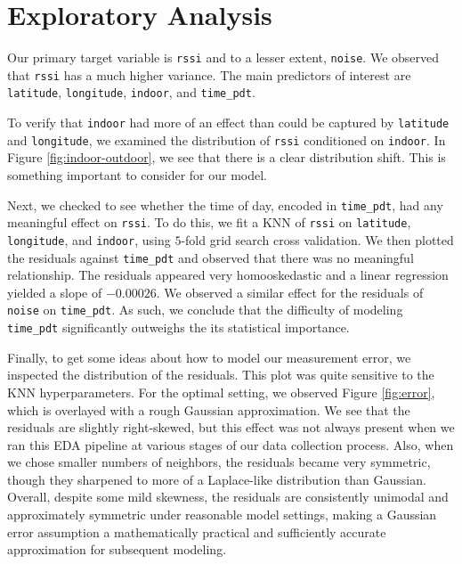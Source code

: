 \documentclass{article}
\begin{document}
\section{Exploratory Analysis}


Our primary target variable is \texttt{rssi} and to a lesser extent, \texttt{noise}. We observed that \texttt{rssi} has a much higher variance. The main predictors of interest are \texttt{latitude}, \texttt{longitude}, \texttt{indoor}, and \texttt{time\_pdt}.

To verify that \texttt{indoor} had more of an effect than could be captured by \texttt{latitude} and \texttt{longitude}, we examined the distribution of \texttt{rssi} conditioned on \texttt{indoor}. In Figure \ref{fig:indoor-outdoor}, we see that there is a clear distribution shift. This is something important to consider for our model.

Next, we checked to see whether the time of day, encoded in \texttt{time\_pdt}, had any meaningful effect on \texttt{rssi}. To do this, we fit a KNN of \texttt{rssi} on \texttt{latitude}, \texttt{longitude}, and \texttt{indoor}, using $5$-fold grid search cross validation. We then plotted the residuals against \texttt{time\_pdt} and observed that there was no meaningful relationship. The residuals appeared very homooskedastic and a linear regression yielded a slope of $-0.00026$. We observed a similar effect for the residuals of \texttt{noise} on \texttt{time\_pdt}. As such, we conclude that the difficulty of modeling \texttt{time\_pdt} significantly outweighs the its statistical importance.



Finally, to get some ideas about how to model our measurement error, we inspected the distribution of the residuals. This plot was quite sensitive to the KNN hyperparameters. For the optimal setting, we observed Figure \ref{fig:error}, which is overlayed with a rough Gaussian approximation. We see that the residuals are slightly right-skewed, but this effect was not always present when we ran this EDA pipeline at various stages of our data collection process. Also, when we chose smaller numbers of neighbors, the residuals became very symmetric, though they sharpened to more of a Laplace-like distribution than Gaussian. Overall, despite some mild skewness, the residuals are consistently unimodal and approximately symmetric under reasonable model settings, making a Gaussian error assumption a mathematically practical and sufficiently accurate approximation for subsequent modeling.
\end{document}
